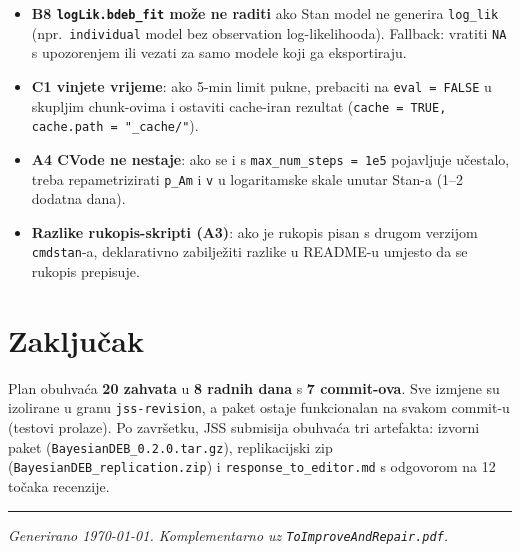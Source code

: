\documentclass[11pt,a4paper]{article}
\newcommand{\code}[1]{\texttt{\small #1}}
\begin{document}
\begin{itemize}[leftmargin=1.4em]
  \item \textbf{B8 \texttt{logLik.bdeb\_fit} može ne raditi} ako
    Stan model ne generira \code{log\_lik} (npr.\ \texttt{individual}
    model bez observation log-likelihooda).  Fallback: vratiti
    \code{NA} s upozorenjem ili vezati za samo modele koji ga
    eksportiraju.
  \item \textbf{C1 vinjete vrijeme}: ako 5-min limit pukne, prebaciti
    na \code{eval = FALSE} u skupljim chunk-ovima i ostaviti
    cache-iran rezultat (\code{cache = TRUE,
    cache.path = "\_cache/"}).
  \item \textbf{A4 CVode ne nestaje}: ako se i s
    \code{max\_num\_steps = 1e5} pojavljuje učestalo, treba
    repametrizirati \code{p\_Am} i \code{v} u logaritamske skale
    unutar Stan-a (1--2 dodatna dana).
  \item \textbf{Razlike rukopis-skripti (A3)}: ako je rukopis
    pisan s drugom verzijom \code{cmdstan}-a, deklarativno
    zabilježiti razlike u README-u umjesto da se rukopis
    prepisuje.
\end{itemize}

\section{Zaključak}

Plan obuhvaća \textbf{20 zahvata} u \textbf{8 radnih dana} s
\textbf{7 commit-ova}.  Sve izmjene su izolirane u granu
\code{jss-revision}, a paket ostaje funkcionalan na svakom commit-u
(testovi prolaze).  Po završetku, JSS submisija obuhvaća tri
artefakta: izvorni paket (\code{BayesianDEB\_0.2.0.tar.gz}),
replikacijski zip (\code{BayesianDEB\_replication.zip}) i
\code{response\_to\_editor.md} s odgovorom na 12 točaka recenzije.

\vspace{0.5em}\hrule\vspace{0.5em}\small
\emph{Generirano \today.  Komplementarno uz
\texttt{ToImproveAndRepair.pdf}.}
\end{document}
